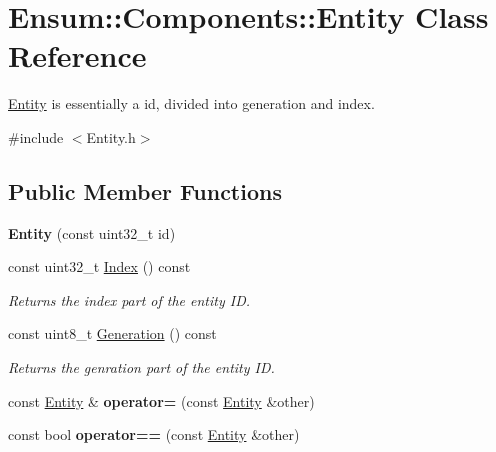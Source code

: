 \hypertarget{class_ensum_1_1_components_1_1_entity}{}\section{Ensum\+:\+:Components\+:\+:Entity Class Reference}
\label{class_ensum_1_1_components_1_1_entity}


\hyperlink{class_ensum_1_1_components_1_1_entity}{Entity} is essentially a id, divided into generation and index.  




{\ttfamily \#include $<$Entity.\+h$>$}

\subsection*{Public Member Functions}
\begin{DoxyCompactItemize}
\item 
{\bfseries Entity} (const uint32\+\_\+t id)\hypertarget{class_ensum_1_1_components_1_1_entity_a4eacdb9354583a1b2a946c4b18ec32af}{}\label{class_ensum_1_1_components_1_1_entity_a4eacdb9354583a1b2a946c4b18ec32af}

\item 
const uint32\+\_\+t \hyperlink{class_ensum_1_1_components_1_1_entity_a166ed226733f98a44407dea8d00d3293}{Index} () const \hypertarget{class_ensum_1_1_components_1_1_entity_a166ed226733f98a44407dea8d00d3293}{}\label{class_ensum_1_1_components_1_1_entity_a166ed226733f98a44407dea8d00d3293}

\begin{DoxyCompactList}\small\item\em Returns the index part of the entity ID. \end{DoxyCompactList}\item 
const uint8\+\_\+t \hyperlink{class_ensum_1_1_components_1_1_entity_addbbcdac8d8fc445292ec8da5f72715e}{Generation} () const \hypertarget{class_ensum_1_1_components_1_1_entity_addbbcdac8d8fc445292ec8da5f72715e}{}\label{class_ensum_1_1_components_1_1_entity_addbbcdac8d8fc445292ec8da5f72715e}

\begin{DoxyCompactList}\small\item\em Returns the genration part of the entity ID. \end{DoxyCompactList}\item 
const \hyperlink{class_ensum_1_1_components_1_1_entity}{Entity} \& {\bfseries operator=} (const \hyperlink{class_ensum_1_1_components_1_1_entity}{Entity} \&other)\hypertarget{class_ensum_1_1_components_1_1_entity_a671dfaa0d8f92f61b3203104770cbc5e}{}\label{class_ensum_1_1_components_1_1_entity_a671dfaa0d8f92f61b3203104770cbc5e}

\item 
const bool {\bfseries operator==} (const \hyperlink{class_ensum_1_1_components_1_1_entity}{Entity} \&other)\hypertarget{class_ensum_1_1_components_1_1_entity_a197bd5c4805c239df5d2aeaeea9794f7}{}\label{class_ensum_1_1_components_1_1_entity_a197bd5c4805c239df5d2aeaeea9794f7}

\end{DoxyCompactItemize}
